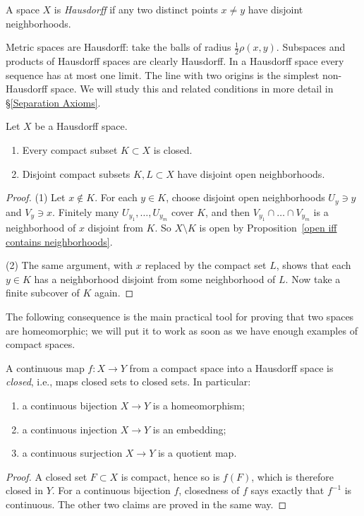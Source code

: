 \begin{defn}
    A space $X$ is \emph{Hausdorff} if any two distinct points $x\neq y$ have disjoint neighborhoods.
\end{defn}

Metric spaces are Hausdorff: take the balls of radius $\frac12\rho(x,y)$. Subspaces and products of Hausdorff spaces are clearly Hausdorff. In a Hausdorff space every sequence has at most one limit. The line with two origins is the simplest non-Hausdorff space. We will study this and related conditions in more detail in \S\ref{Separation Axioms}.

\begin{prop}\label{prop compact in Hausdorff}
    Let $X$ be a Hausdorff space.
    \begin{enumerate}
        \item Every compact subset $K\subset X$ is closed.
        \item Disjoint compact subsets $K,L\subset X$ have disjoint open neighborhoods.
    \end{enumerate}
\end{prop}
\begin{proof}
    (1) Let $x\notin K$. For each $y\in K$, choose disjoint open neighborhoods $U_y\ni y$ and $V_y\ni x$. Finitely many $U_{y_1},\ldots,U_{y_m}$ cover $K$, and then $V_{y_1}\cap\ldots\cap V_{y_m}$ is a neighborhood of $x$ disjoint from $K$. So $X\setminus K$ is open by Proposition~\ref{open iff contains neighborhoods}.

    (2) The same argument, with $x$ replaced by the compact set $L$, shows that each $y\in K$ has a neighborhood disjoint from some neighborhood of $L$. Now take a finite subcover of $K$ again.
\end{proof}

The following consequence is the main practical tool for proving that two spaces are homeomorphic; we will put it to work as soon as we have enough examples of compact spaces.

\begin{prop}\label{prop compact to Hausdorff}
    A continuous map $f:X\to Y$ from a compact space into a Hausdorff space is \emph{closed}, i.e., maps closed sets to closed sets. In particular:
    \begin{enumerate}
        \item a continuous bijection $X\to Y$ is a homeomorphism;
        \item a continuous injection $X\to Y$ is an embedding;
        \item a continuous surjection $X\to Y$ is a quotient map.
    \end{enumerate}
\end{prop}
\begin{proof}
    A closed set $F\subset X$ is compact, hence so is $f(F)$, which is therefore closed in $Y$. For a continuous bijection $f$, closedness of $f$ says exactly that $f^{-1}$ is continuous. The other two claims are proved in the same way.
\end{proof}

